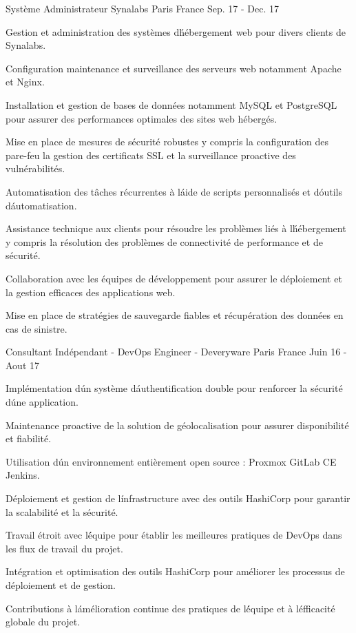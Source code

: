 \begin{cventries}
\cventry
{Système Administrateur} %
{Synalabs} %
{Paris France} %
{Sep. 17 - Dec. 17 } %
{
  \begin{cvitems} %
    \item {Gestion et administration des systèmes d\' hébergement web pour divers clients de Synalabs.}
    \item {Configuration maintenance et surveillance des serveurs web notamment Apache et Nginx.}
    \item {Installation et gestion de bases de données notamment MySQL et PostgreSQL pour assurer des performances optimales des sites web hébergés.}
    \item {Mise en place de mesures de sécurité robustes y compris la configuration des pare-feu la gestion des certificats SSL et la surveillance proactive des vulnérabilités.}
    \item {Automatisation des tâches récurrentes à l\' aide de scripts personnalisés et d\' outils d\' automatisation.}
    \item {Assistance technique aux clients pour résoudre les problèmes liés à l\' hébergement y compris la résolution des problèmes de connectivité de performance et de sécurité.}
    \item {Collaboration avec les équipes de développement pour assurer le déploiement et la gestion efficaces des applications web.}
    \item {Mise en place de stratégies de sauvegarde fiables et récupération des données en cas de sinistre.}
  \end{cvitems}
}

\cventry
{Consultant Indépendant - DevOps Engineer -} %
{Deveryware} %
{Paris France} %
{Juin 16 - Aout 17} %
{
  \begin{cvitems} %
    \item {Implémentation d\' un système d\' authentification double pour renforcer la sécurité d\' une application.}
    \item {Maintenance proactive de la solution de géolocalisation pour assurer disponibilité et fiabilité.}
    \item {Utilisation d\' un environnement entièrement open source : Proxmox GitLab CE Jenkins.}
    \item {Déploiement et gestion de l\' infrastructure avec des outils HashiCorp pour garantir la scalabilité et la sécurité.}
    \item {Travail étroit avec l\' équipe pour établir les meilleures pratiques de DevOps dans les flux de travail du projet.}
    \item {Intégration et optimisation des outils HashiCorp pour améliorer les processus de déploiement et de gestion.}
    \item {Contributions à l\' amélioration continue des pratiques de l\' équipe et à l\' efficacité globale du projet.}
  \end{cvitems}
}


\end{cventries}

